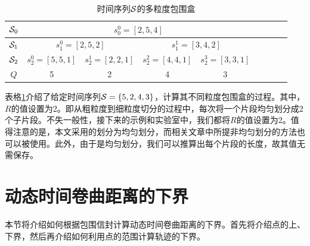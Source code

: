 \begin{table}[t]
	\centering  
	\renewcommand\arraystretch{1.2}
	\begin{tabular}{|c|c|c|c|c|c|c|c|c|} 
		\hline
		${\cal S}_{0}$ &  \multicolumn{4}{|c|}{$s_{0}^{0}={[2,5,4]}$} \\ \hline
		${\cal S}_{1}$ & \multicolumn{2}{|c|}{$s_{1}^{0}={[2,5,2]}$} & \multicolumn{2}{|c|}{$s_{1}^{1}={[3,4,2]}$} \\ \hline 
		${\cal S}_{2}$ & \multicolumn{1}{|c|}{$s_{2}^{0}={[5,5,1]}$} & \multicolumn{1}{|c|}{$s_{2}^{1}={[2,2,1]}$} &
		\multicolumn{1}{|c|}{$s_{2}^{2}={[4,4,1]}$} &  \multicolumn{1}{|c|}{$s_{2}^{3}={[3,3,1]}$} \\ \hline 
		$Q$ & 5 & 2 & 4 & 3
		\\ \hline
	\end{tabular}
	\caption{时间序列$\cal S$的多粒度包围盒}
	\label{table:BE}
\end{table}
表格\ref{table:BE}介绍了给定时间序列${\cal S}=\{5,2,4,3\}$，计算其不同粒度包围盒的过程。其中，$R$的值设置为2。即从粗粒度到细粒度切分的过程中，每次将一个片段均匀划分成2个子片段。不失一般性，接下来的示例和实验室中，我们都将$R$的值设置为2。值得注意的是，本文采用的划分为均匀划分，而相关文章中所提非均匀划分的方法也可以被使用。此外，由于是均匀划分，我们可以推算出每个片段的长度，故其值无需保存。
 

%
%


\section{动态时间卷曲距离的下界}\label{sec-c5-lowerBound}
 本节将介绍如何根据包围信封计算动态时间卷曲距离的下界。首先将介绍点的上、下界，然后再介绍如何利用点的范围计算轨迹的下界。
 
